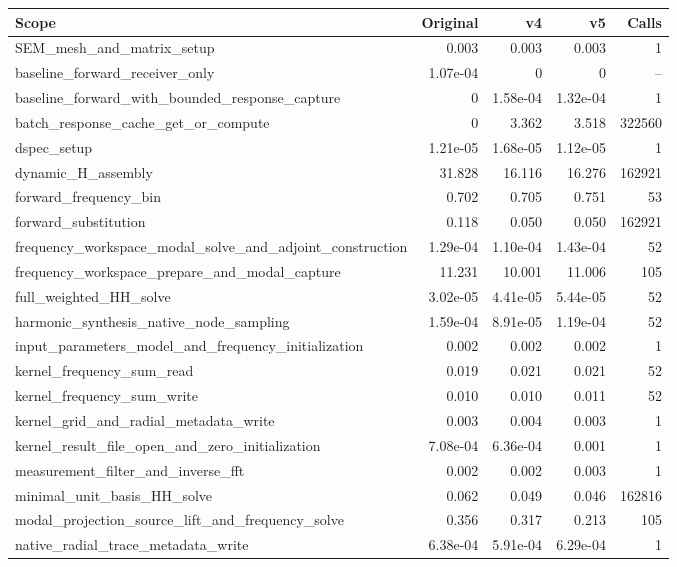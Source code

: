 \documentclass[11pt,a4paper]{article}
\begin{document}
\begin{longtable}{>{\raggedright\arraybackslash}p{10cm}rrrr}
\toprule Scope & Original & v4 & v5 & Calls\\\midrule\endhead

SEM\_mesh\_and\_matrix\_setup & 0.003 & 0.003 & 0.003 & 1 \\
baseline\_forward\_receiver\_only & 1.07e-04 & 0 & 0 & -- \\
baseline\_forward\_with\_bounded\_response\_capture & 0 & 1.58e-04 & 1.32e-04 & 1 \\
batch\_response\_cache\_get\_or\_compute & 0 & 3.362 & 3.518 & 322560 \\
dspec\_setup & 1.21e-05 & 1.68e-05 & 1.12e-05 & 1 \\
dynamic\_H\_assembly & 31.828 & 16.116 & 16.276 & 162921 \\
forward\_frequency\_bin & 0.702 & 0.705 & 0.751 & 53 \\
forward\_substitution & 0.118 & 0.050 & 0.050 & 162921 \\
frequency\_workspace\_modal\_solve\_and\_adjoint\_construction & 1.29e-04 & 1.10e-04 & 1.43e-04 & 52 \\
frequency\_workspace\_prepare\_and\_modal\_capture & 11.231 & 10.001 & 11.006 & 105 \\
full\_weighted\_HH\_solve & 3.02e-05 & 4.41e-05 & 5.44e-05 & 52 \\
harmonic\_synthesis\_native\_node\_sampling & 1.59e-04 & 8.91e-05 & 1.19e-04 & 52 \\
input\_parameters\_model\_and\_frequency\_initialization & 0.002 & 0.002 & 0.002 & 1 \\
kernel\_frequency\_sum\_read & 0.019 & 0.021 & 0.021 & 52 \\
kernel\_frequency\_sum\_write & 0.010 & 0.010 & 0.011 & 52 \\
kernel\_grid\_and\_radial\_metadata\_write & 0.003 & 0.004 & 0.003 & 1 \\
kernel\_result\_file\_open\_and\_zero\_initialization & 7.08e-04 & 6.36e-04 & 0.001 & 1 \\
measurement\_filter\_and\_inverse\_fft & 0.002 & 0.002 & 0.003 & 1 \\
minimal\_unit\_basis\_HH\_solve & 0.062 & 0.049 & 0.046 & 162816 \\
modal\_projection\_source\_lift\_and\_frequency\_solve & 0.356 & 0.317 & 0.213 & 105 \\
native\_radial\_trace\_metadata\_write & 6.38e-04 & 5.91e-04 & 6.29e-04 & 1 \\

\end{longtable}
\end{document}

